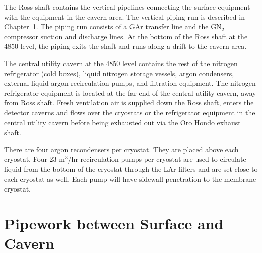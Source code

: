 The Ross shaft contains the vertical pipelines connecting the 
surface equipment with the equipment in the cavern area. The 
vertical piping run is described in 
Chapter~\ref{sec:cryo-cryosys-pipework-surface-cav}. 
The piping run consists of a GAr transfer line and the 
GN$_2$ compressor suction and discharge lines. At the bottom of 
the Ross shaft at the 4850 level, the piping exits the 
shaft and runs along a drift to the cavern area.

The central utility cavern at the 4850 level contains the
rest of the nitrogen refrigerator (cold boxes), liquid
nitrogen storage vessels, argon condensers, external liquid
argon recirculation pumps, and filtration equipment.
The nitrogen refrigerator equipment is located at the far
end of the central utility cavern, away from Ross shaft.
Fresh ventilation air is supplied down the Ross shaft, 
enters the detector caverns and flows over the cryostats 
or the refrigerator equipment in the central utility 
cavern before being exhausted out via the Oro Hondo
exhaust shaft.

There are four argon recondensers per cryostat. They are 
placed above each cryostat. Four 23 m$^3$/hr recirculation 
pumps per cryostat are used to circulate liquid from the bottom 
of the cryostat through the LAr filters and are set close to 
each cryostat as well. Each pump will have sidewall
penetration to the membrane cryostat. 


\chapter{Pipework between Surface and Cavern}
\label{sec:cryo-cryosys-pipework-surface-cav}

